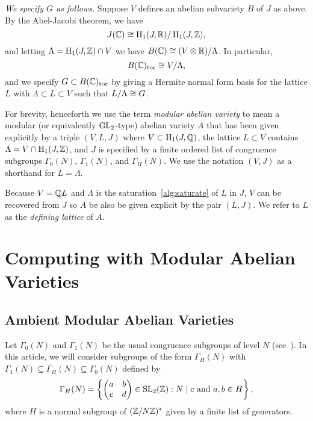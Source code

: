 \documentclass{article}
\begin{document}
{\em We specify $G$ as follows.}
Suppose $V$ defines an abelian subvariety $B$ of $J$ as above.
By the Abel-Jacobi theorem, we have
$$
J(\mathbb{C}) \cong \operatorname{H}_1(J, \mathbb{R}) / \operatorname{H}_1(J,\mathbb{Z}),
$$
and letting $\Lambda = \operatorname{H}_1(J,\mathbb{Z}) \cap V$ we have
$B(\mathbb{C}) \cong (V\otimes\mathbb{R}) / \Lambda$.
In particular,
$$
B(\mathbb{C})_{\operatorname{tor}} \cong V/\Lambda,
$$
and we specify $G\subset B(\mathbb{C})_{\operatorname{tor}}$ by giving a Hermite normal form basis
for the lattice $L$ with $\Lambda \subset L\subset V$ such that $L/\Lambda
\cong G$.


For brevity, henceforth we use the term {\em modular abelian variety}
to mean a modular (or equivalently $\operatorname{GL}_2$-type) abelian variety $A$
that has been given explicitly by a triple $(V,L,J)$ where $V\subset
\operatorname{H}_1(J,\mathbb{Q})$, the lattice $L\subset V$ contains $\Lambda = V\cap
\operatorname{H}_1(J,\mathbb{Z})$, and $J$ is specified by a finite ordered list of
congruence subgroups $\Gamma_0(N)$, $\Gamma_1(N)$, and $\Gamma_H(N)$.
We use the notation $(V,J)$ as a shorthand for $L=\Lambda$.  

Because $V = \mathbb{Q} L$ and $\Lambda$ is the saturation~\ref{alg:saturate} of $L$
in $J$, $V$ can be recovered from $J$ so $A$ be also be given explicit by the
pair $(L, J)$. We refer to $L$ as the \emph{defining lattice} of $A$.



\section{Computing with Modular Abelian Varieties}

\subsection{Ambient Modular Abelian Varieties}
\label{sec:amb_modabvar}

Let $\Gamma_0(N)$ and $\Gamma_1(N)$ be the usual congruence subgroups of level
$N$ (see~\cite{stein:modular_forms:2007}). In this article, we will consider subgroups of
the form $\Gamma_H(N)$ with $\Gamma_1(N)\subseteq \Gamma_H(N)\subseteq
\Gamma_0(N)$ defined by
\[
    \Gamma_H(N) =
    \left\{
        \begin{pmatrix}
            a & b \\
            c & d
        \end{pmatrix}
        \in \operatorname{SL}_2(\mathbb{Z}) :
        N\mid c \text{ and } a,b\in H
    \right\},
\]
where $H$ is a normal subgroup of $(\mathbb{Z}/N\mathbb{Z})^*$ given by a finite list of
generators.
\end{document}
